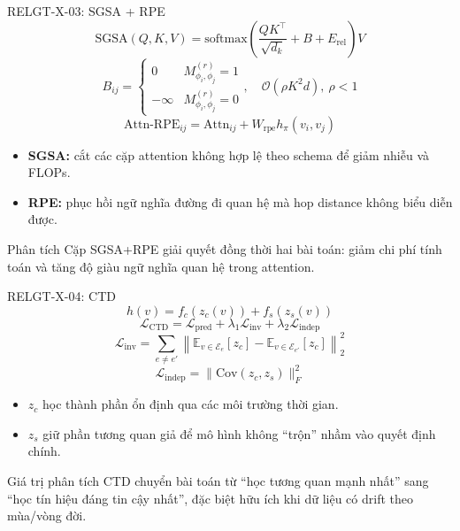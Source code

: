 \documentclass[aspectratio=169,11pt]{beamer}
\begin{document}
\begin{frame}{RELGT-X-03: SGSA + RPE}
  \[
    \text{SGSA}(Q,K,V)=\text{softmax}\left(\frac{QK^\top}{\sqrt{d_k}}+B+E_\text{rel}\right)V
  \]
  \[
    B_{ij}=
    \begin{cases}
      0 & M_{\phi_i,\phi_j}^{(r)}=1\\
      -\infty & M_{\phi_i,\phi_j}^{(r)}=0
    \end{cases},\quad
    \mathcal{O}(\rho K^2d),\ \rho<1
  \]
  \[
    \text{Attn-RPE}_{ij}=\text{Attn}_{ij}+W_\text{rpe}h_\pi(v_i,v_j)
  \]
  \begin{itemize}
    \item \textbf{SGSA:} cắt các cặp attention không hợp lệ theo schema để giảm nhiễu và FLOPs.
    \item \textbf{RPE:} phục hồi ngữ nghĩa đường đi quan hệ mà hop distance không biểu diễn được.
  \end{itemize}
  \begin{block}{Phân tích}
    Cặp SGSA+RPE giải quyết đồng thời hai bài toán: giảm chi phí tính toán và tăng độ giàu ngữ nghĩa quan hệ trong attention.
  \end{block}
\end{frame}

\begin{frame}{RELGT-X-04: CTD}
  \[
    h(v)=f_c(z_c(v))+f_s(z_s(v))
  \]
  \[
    \mathcal{L}_\text{CTD}=\mathcal{L}_\text{pred}+\lambda_1\mathcal{L}_\text{inv}+\lambda_2\mathcal{L}_\text{indep}
  \]
  \[
    \mathcal{L}_\text{inv}=\sum_{e\ne e'}\left\|\mathbb{E}_{v\in\mathcal{E}_e}[z_c]-\mathbb{E}_{v\in\mathcal{E}_{e'}}[z_c]\right\|_2^2
  \]
  \[
    \mathcal{L}_\text{indep}=\|\text{Cov}(z_c,z_s)\|_F^2
  \]
  \begin{itemize}
    \item \textbf{$z_c$} học thành phần ổn định qua các môi trường thời gian.
    \item \textbf{$z_s$} giữ phần tương quan giả để mô hình không “trộn” nhầm vào quyết định chính.
  \end{itemize}
  \begin{alertblock}{Giá trị phân tích}
    CTD chuyển bài toán từ “học tương quan mạnh nhất” sang “học tín hiệu đáng tin cậy nhất”, đặc biệt hữu ích khi dữ liệu có drift theo mùa/vòng đời.
  \end{alertblock}
\end{frame}
\end{document}
